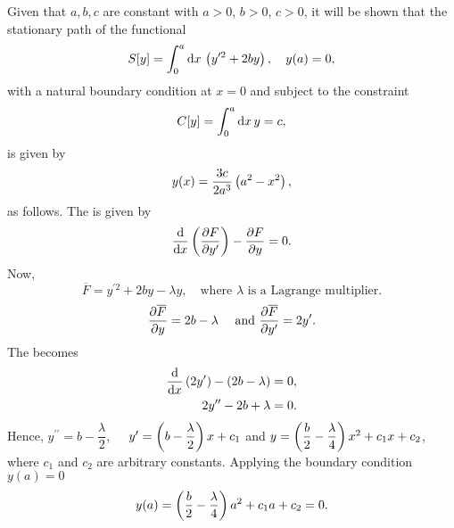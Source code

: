 \begin{question}
Given that $a, b, c$ are constant with $a > 0$, $b > 0$, $c > 0$, it will be shown that the stationary path of the functional
\[
	S[y] = \int_{0}^{a}\mathrm{d} x\, \left(y^{\prime 2} + 2b y\right),\quad y(a) = 0,
\]
with a natural boundary condition at $x = 0$ and subject to the constraint
\[
	C[y] = \int_{0}^{a}\mathrm{d} x\, y = c,
\]
is given by
\[
	y(x) = \frac{3c}{2a^3}\left(a^2-x^2\right),
\]
 as follows.
 The \el is given by
 \[
 	\frac{\mathrm{d}}{\mathrm{d}x}\left(\frac{\partial F}{\partial y^\prime}\right)-\frac{\partial F}{\partial y} = 0.
 \]
 Now, 
 \[
 	\overline{F} = y^{\prime 2} + 2b y -\lambda y,\quad\text{where } \lambda\text{ is a Lagrange multiplier.}
 \]
 \[
 	\frac{\partial \overline{F}}{\partial y} =2b -\lambda\quad\text{ and } \frac{\partial \overline{F}}{\partial y^\prime} = 2y^\prime.
 \]
 The \el becomes
 \begin{align*}
 	\frac{\mathrm{d}}{\mathrm{d}x}\left(2y^\prime\right)-\left(2b-\lambda\right) = 0,\\
 	2y^{\prime\prime} - 2b + \lambda = 0.
 \end{align*}
 Hence, $y^{\prime\prime}=b-\dfrac{\lambda}{2},\quad$ 
 $y^{\prime}=\left(b-\dfrac{\lambda}{2}\right) x+c_1$ and 
 $y=\left(\dfrac{b}{2}-\dfrac{\lambda}{4}\right) x^2 + c_1x + c_2$, where $c_1$ and $c_2$ are arbitrary constants.  Applying the boundary condition $y(a)=0$
 \[
 	y(a)=\left(\dfrac{b}{2}-\dfrac{\lambda}{4}\right) a^2 + c_1a + c_2=0.
 \]
 
 \end{question}
